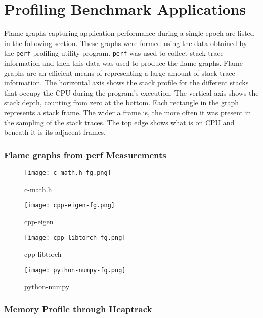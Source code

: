 \chapter{Profiling Benchmark Applications} \label{hdrnn-profile}

Flame graphs capturing application performance during a single epoch are listed in the following section. These graphs were formed using the data obtained by the \texttt{perf} profiling utility program. \texttt{perf} was used to collect stack trace information and then this data was used to produce the flame graphs. Flame graphs are an efficient means of representing a large amount of stack trace information. The horizontal axis shows the stack profile for the different stacks that occupy the CPU during the program's execution. The vertical axis shows the stack depth, counting from zero at the bottom. Each rectangle in the graph represents a stack frame. The wider a frame is, the more often it was present in the sampling of the stack traces. The top edge shows what is on CPU and beneath it is its adjacent frames.

\subsection*{Flame graphs from perf Measurements}

\begin{figure}[H]
	\centering
	\texttt{[image: c-math.h-fg.png]}
	\caption{c-math.h}
\end{figure}

\begin{figure}[H]
	\centering
	\texttt{[image: cpp-eigen-fg.png]}
	\caption{cpp-eigen}
\end{figure}

\begin{figure}[H]
	\centering
	\texttt{[image: cpp-libtorch-fg.png]}
	\caption{cpp-libtorch}
\end{figure}

\begin{figure}[H]
	\centering
	\texttt{[image: python-numpy-fg.png]}
	\caption{python-numpy}
\end{figure}

\subsection*{Memory Profile through Heaptrack} \label{hdrnn-memory-profile}

